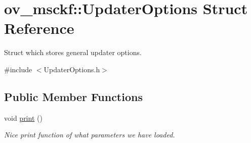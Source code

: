 \hypertarget{structov__msckf_1_1UpdaterOptions}{}\section{ov\+\_\+msckf\+:\+:Updater\+Options Struct Reference}
\label{structov__msckf_1_1UpdaterOptions}


Struct which stores general updater options.  




{\ttfamily \#include $<$Updater\+Options.\+h$>$}

\subsection*{Public Member Functions}
\begin{DoxyCompactItemize}
\item 
\mbox{\label{structov__msckf_1_1UpdaterOptions_a0c5cea150bb07df959675b652a55ecd6}} 
void \hyperlink{structov__msckf_1_1UpdaterOptions_a0c5cea150bb07df959675b652a55ecd6}{print} ()
\begin{DoxyCompactList}\small\item\em Nice print function of what parameters we have loaded. \end{DoxyCompactList}\end{DoxyCompactItemize}
